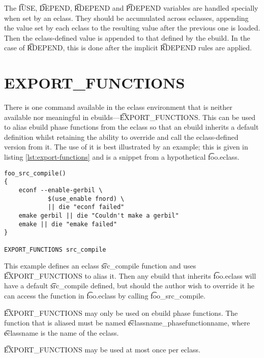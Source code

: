 The \t{IUSE}, \t{DEPEND}, \t{RDEPEND} and \t{PDEPEND} variables are handled specially
when set by an eclass. They should be accumulated across eclasses, appending the value set by each
eclass to the resulting value after the previous one is loaded. Then the eclass-defined value is
appended to that defined by the ebuild. In the case of \t{RDEPEND}, this is done after the
implicit \t{RDEPEND} rules are applied.

\section{EXPORT\_FUNCTIONS}

There is one command available in the eclass environment that is neither available nor meaningful
in ebuilds---\t{EXPORT\_FUNCTIONS}. This can be used to alias ebuild phase functions from the
eclass so that an ebuild inherits a default definition whilst retaining the ability to override and
call the eclass-defined version from it. The use of it is best illustrated by an example; this is
given in listing \ref{lst:export-functions} and is a snippet from a hypothetical \t{foo.eclass}.

\begin{lstlisting}[float,caption=EXPORT\_FUNCTIONS example: foo.eclass,label=lst:export-functions]
foo_src_compile()
{
    econf --enable-gerbil \
            $(use_enable fnord) \
            || die "econf failed"
    emake gerbil || die "Couldn't make a gerbil"
    emake || die "emake failed"
}

EXPORT_FUNCTIONS src_compile
\end{lstlisting}

This example defines an eclass \t{src\_compile} function and uses \t{EXPORT\_FUNCTIONS} to alias
it. Then any ebuild that inherits \t{foo.eclass} will have a default \t{src\_compile} defined, but
should the author wish to override it he can access the function in \t{foo.eclass} by calling
\t{foo\_src\_compile}.

\t{EXPORT\_FUNCTIONS} may only be used on ebuild phase functions. The function that is aliased
must be named \t{eclassname\_phasefunctionname}, where \t{eclassname} is the name of the eclass.

\t{EXPORT\_FUNCTIONS} may be used at most once per eclass.

